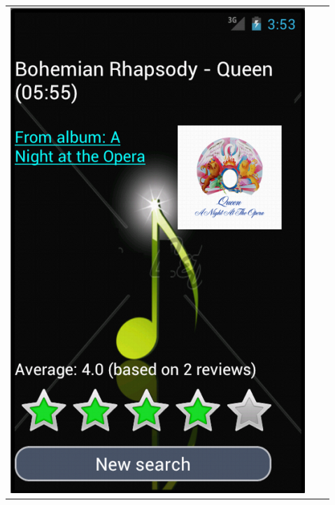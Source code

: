 \documentclass[11pt,a4paper]{article}
\begin{document}
\begin{tabular}{l l l}
	\includegraphics[scale=0.4]{GUI_0124_track.png} &

\end{tabular}
\end{document}

